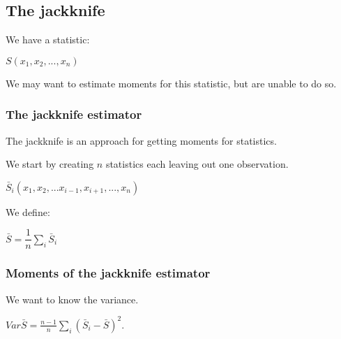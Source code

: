 
\subsection{The jackknife}

We have a statistic:

\(S(x_1, x_2,...,x_n)\)

We may want to estimate moments for this statistic, but are unable to do so.

\subsubsection{The jackknife estimator}

The jackknife is an approach for getting moments for statistics.

We start by creating \(n\) statistics each leaving out one observation. 

\(\bar S_i(x_1,x_2,...x_{i-1},x_{i+1},...,x_n)\)

We define:

\(\bar S=\dfrac{1}{n}\sum_i\bar S_i\)

\subsubsection{Moments of the jackknife estimator}

We want to know the variance.

\(Var \bar S=\frac{n-1}{n}\sum_i(\bar S_i-\bar S)^2\).

